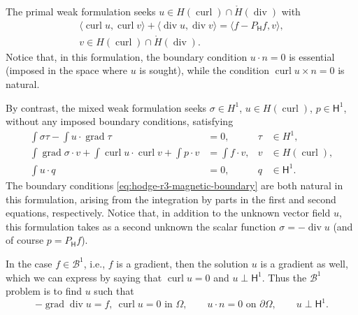 {The primal weak formulation seeks $u\in H(\operatorname{curl})\cap\mathring H(\operatorname{div})$ with}
\begin{equation}\label{eq:hodge-r3-magnetic-primal}
\begin{gathered}
\langle\operatorname{curl}u,\operatorname{curl}v\rangle+\langle\operatorname{div}u,\operatorname{div}v\rangle=\langle f-P_{\mathsf H}f,v\rangle,\\
v\in H(\operatorname{curl})\cap\mathring H(\operatorname{div}).
\end{gathered}
\end{equation}
{Notice that, in this formulation, the boundary condition $u\cdot n=0$ is essential (imposed in the space where $u$ is sought), while the condition $\operatorname{curl}u\times n=0$ is natural.}

{By contrast, the mixed weak formulation seeks $\sigma\in H^1$, $u\in H(\operatorname{curl})$, $p\in\mathsf H^1$, without any imposed boundary conditions, satisfying}
\begin{equation}\label{eq:hodge-r3-magnetic-mixed}
\begin{aligned}
\int\sigma\tau-\int u\cdot\operatorname{grad}\tau&=0,&\tau&\in H^1,\\
\int\operatorname{grad}\sigma\cdot v+\int\operatorname{curl}u\cdot\operatorname{curl}v+\int p\cdot v&=\int f\cdot v,&v&\in H(\operatorname{curl}),\\
\int u\cdot q&=0,&q&\in\mathsf H^1.
\end{aligned}
\end{equation}
{The boundary conditions \eqref{eq:hodge-r3-magnetic-boundary} are both natural in this formulation, arising from the integration by parts in the first and second equations, respectively. Notice that, in addition to the unknown vector field $u$, this formulation takes as a second unknown the scalar function $\sigma=-\operatorname{div}u$ (and of course $p=P_{\mathsf H}f$).}

{In the case $f\in\mathcal B^1$, i.e., $f$ is a gradient, then the solution $u$ is a gradient as well, which we can express by saying that $\operatorname{curl}u=0$ and $u\perp\mathsf H^1$. Thus the $\mathcal B^1$ problem is to find $u$ such that}
\[
-\operatorname{grad}\operatorname{div}u=f,\ \operatorname{curl}u=0\text{ in }\Omega,\qquad u\cdot n=0\text{ on }\partial\Omega,\qquad u\perp\mathsf H^1.
\]

